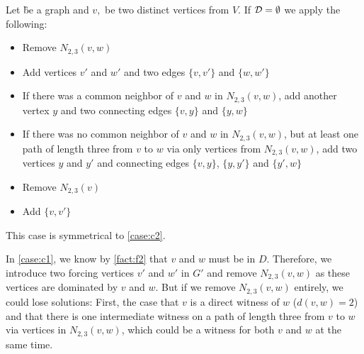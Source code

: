 \begin{rgl}\label{rgl:rtwo}
    Let \G be a graph and $v,$ be two distinct vertices from $V$. If $\mathbf{\mathcal{D} = \emptyset}$ we apply the following:
    \begin{caseof}

        \vspace{-5mm}
        \begin{itemize}
            \item Remove $N_{2,3}(v,w)$
            \item Add vertices $v'$ and $w'$ and two edges $\{v, v'\}$ and $\{w, w'\}$
            \item If there was a common neighbor of $v$ and $w$ in $N_{2,3}(v,w)$, add another vertex $y$ and two connecting edges  $\{v, y\}$ and $\{y, w\}$
            \item If there was no common neighbor of $v$ and $w$ in $N_{2,3}(v,w)$, but at least one path of length three from $v$ to $w$ via only vertices from $N_{2,3}(v,w)$, add two vertices $y$ and $y'$ and connecting edges $\{v,y\}$, $\{y, y'\}$ and $\{y', w\}$
        \end{itemize}

        \vspace{-5mm}
        \begin{itemize}
            \item Remove $N_{2,3}(v)$
            \item Add $\{v, v'\}$
        \end{itemize}
        
         This case is symmetrical to \cref{case:c2}.
    \end{caseof}
\end{rgl}

In \cref{case:c1}, we know by \cref{fact:f2} that $v$ and $w$ must be in $D$. Therefore, we introduce two forcing vertices $v'$ and $w'$ in $G'$ and remove $N_{2,3}(v,w)$ as these vertices are dominated by $v$ and $w$.
But if we remove $N_{2,3}(v,w)$ entirely, we could lose solutions: First, the case that $v$ is a direct witness of $w$ ($d(v,w) = 2$) and that there is one intermediate witness on a path of length three from $v$ to $w$ via vertices in $N_{2,3}(v,w)$, which could be a witness for both $v$ and $w$ at the same time. 

